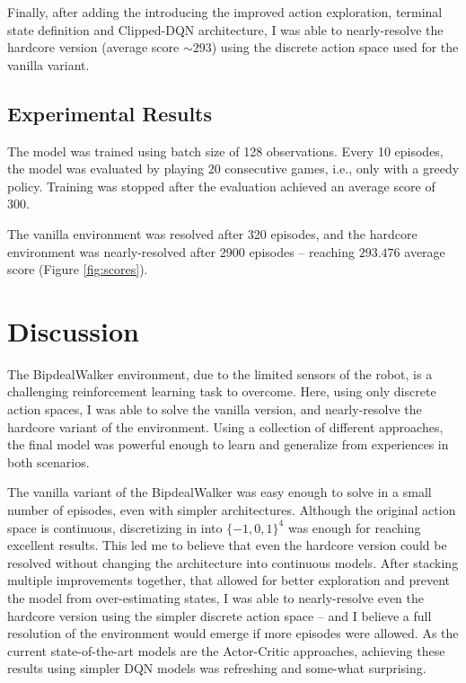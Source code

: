 \documentclass{article}
\begin{document}
\begin{multicols}{2}
Finally, after adding the introducing the improved action exploration, terminal state definition and Clipped-DQN architecture, I was able to nearly-resolve the hardcore version (average score $\sim 293$) using the discrete action space used for the vanilla variant.

\subsection{Experimental Results}
\label{section:results}
 The model was trained using batch size of 128 observations. Every 10 episodes, the model was evaluated by playing 20 consecutive games, i.e., only with a greedy policy. Training was stopped after the evaluation achieved an average score of 300.
 
 The vanilla environment was resolved after 320 episodes, and the hardcore environment was nearly-resolved after 2900 episodes -- reaching $293.476$ average score (Figure \ref{fig:scores}).
 

 
\section{Discussion}
The BipdealWalker environment, due to the limited sensors of the robot, is a challenging reinforcement learning task to overcome. Here, using only discrete action spaces, I was able to solve the vanilla version, and nearly-resolve the hardcore variant of the environment. Using a collection of different approaches, the final model was powerful enough to learn and generalize from experiences in both scenarios.

The vanilla variant of the BipdealWalker was easy enough to solve in a small number of episodes, even with simpler architectures. Although the original action space is continuous, discretizing in into $\{-1, 0, 1\}^4$ was enough for reaching excellent results. This led me to believe that even the hardcore version could be resolved without changing the architecture into continuous models. After stacking multiple improvements together, that allowed for better exploration and prevent the model from over-estimating states, I was able to nearly-resolve even the hardcore version using the simpler discrete action space -- and I believe a full resolution of the environment would emerge if more episodes were allowed. As the current state-of-the-art models are the Actor-Critic approaches, achieving these results using simpler DQN models was refreshing and some-what surprising.


\end{multicols}
\end{document}
